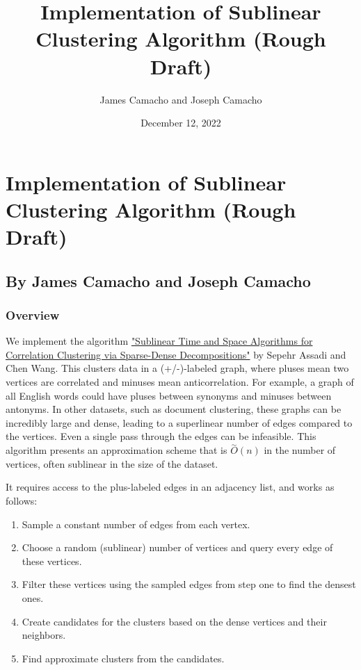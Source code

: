 \documentclass[
]{article}
\title{Implementation of Sublinear Clustering Algorithm (Rough Draft)}
\author{James Camacho and Joseph Camacho}
\date{December 12, 2022}
\providecommand{\tightlist}{%
  \setlength{\itemsep}{0pt}\setlength{\parskip}{0pt}}
\begin{document}
\maketitle

\hypertarget{implementation-of-sublinear-clustering-algorithm-rough-draft}{%
\section{Implementation of Sublinear Clustering Algorithm (Rough
Draft)}\label{implementation-of-sublinear-clustering-algorithm-rough-draft}}

\hypertarget{by-james-camacho-and-joseph-camacho}{%
\subsection{By James Camacho and Joseph
Camacho}\label{by-james-camacho-and-joseph-camacho}}

\hypertarget{overview}{%
\subsubsection{Overview}\label{overview}}

We implement the algorithm
\href{https://doi.org/10.48550/arxiv.2109.14528}{"Sublinear Time and
Space Algorithms for Correlation Clustering via Sparse-Dense
Decompositions"} by Sepehr Assadi and Chen Wang. This clusters data in a
(+/-)-labeled graph, where pluses mean two vertices are correlated and
minuses mean anticorrelation. For example, a graph of all English words
could have pluses between synonyms and minuses between antonyms. In
other datasets, such as document clustering, these graphs can be
incredibly large and dense, leading to a superlinear number of edges
compared to the vertices. Even a single pass through the edges can be
infeasible. This algorithm presents an approximation scheme that is
{\(\overset{\sim}{O}(n)\)} in the number of vertices, often sublinear in
the size of the dataset.

It requires access to the plus-labeled edges in an adjacency list, and
works as follows:

\begin{enumerate}
\tightlist
\item
  Sample a constant number of edges from each vertex.
\item
  Choose a random (sublinear) number of vertices and query every edge of
  these vertices.
\item
  Filter these vertices using the sampled edges from step one to find
  the densest ones.
\item
  Create candidates for the clusters based on the dense vertices and
  their neighbors.
\item
  Find approximate clusters from the candidates.
\end{enumerate}
\end{document}
